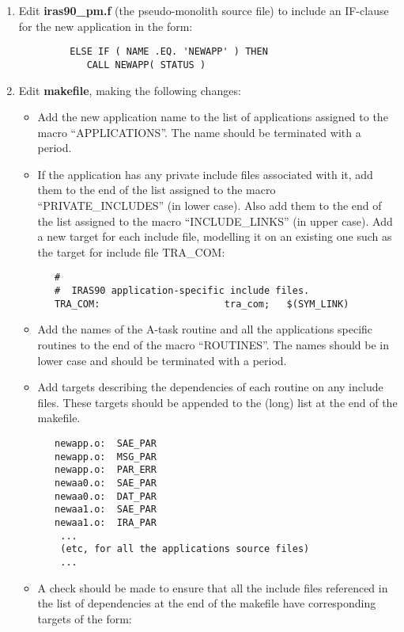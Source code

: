 \begin{enumerate}
\item Edit {\bf iras90\_pm.f} (the pseudo-monolith source file) to include an
IF-clause for the new application in the form:

\small
\begin{verbatim}
         ELSE IF ( NAME .EQ. 'NEWAPP' ) THEN
            CALL NEWAPP( STATUS )
\end{verbatim}
\normalsize

\item Edit {\bf makefile}, making the following changes:
\begin{itemize}
\item Add the new application name to the list of applications
assigned to the macro ``{\small APPLICATIONS}''. The name should be terminated
with a period.
\item If the application has any private include files associated with it, add
them to the end of the list assigned to the macro ``{\small PRIVATE\_INCLUDES}''
(in lower case). Also add them to the end of the list assigned to the macro
``{\small INCLUDE\_LINKS}'' (in upper case). Add a new target for each include
file, modelling it on an existing one such as the target for include file
{\small TRA\_COM}:

\small
\begin{verbatim}
   #
   #  IRAS90 application-specific include files.
   TRA_COM:                      tra_com;   $(SYM_LINK)
\end{verbatim}
\normalsize

\item Add the names of the A-task routine and all the applications specific
routines to the end of the macro ``{\small ROUTINES}''. The names should be in
lower case and should be terminated with a period.

\item Add targets describing the dependencies of each routine on any include
files. These targets should be appended to the (long) list at the end of the
makefile.

\small
\begin{verbatim}
   newapp.o:  SAE_PAR
   newapp.o:  MSG_PAR
   newapp.o:  PAR_ERR
   newaa0.o:  SAE_PAR
   newaa0.o:  DAT_PAR
   newaa1.o:  SAE_PAR
   newaa1.o:  IRA_PAR
    ...
    (etc, for all the applications source files)
    ...
\end{verbatim}

\item A check should be made to ensure that all the include files referenced in
the list of dependencies at the end of the makefile have corresponding targets
of the form:


\end{itemize}
\end{enumerate}
